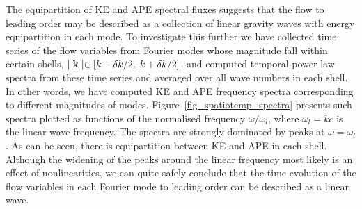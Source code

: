 The equipartition of KE and APE spectral fluxes suggests that the flow to
leading order may be described as a collection of linear gravity waves with energy
equipartition in each mode. To investigate this further we have
collected time series of the flow variables from Fourier modes whose magnitude
fall within certain shells, $ \mid {\bf k} \mid \in [ k -\delta k/2, \; k+
\delta k/2] $, and computed temporal power law spectra from these time series
and averaged over all wave numbers in each shell. In other words, we have
computed KE and APE frequency spectra corresponding to different magnitudes of
modes. Figure~\ref{fig_spatiotemp_spectra} presents such spectra plotted as 
functions of the normalised frequency $\omega/\omega_l$, where $ \omega_l = kc
$ is the linear wave frequency. The spectra are strongly dominated by peaks at
$\omega = \omega_l$. As can be seen, there is equipartition between KE and APE
in each shell. Although the widening of the peaks around the linear frequency
most likely is an effect of nonlinearities, we can quite safely conclude that
the time evolution of the flow variables in each Fourier mode to leading order
can be described as a linear wave.

